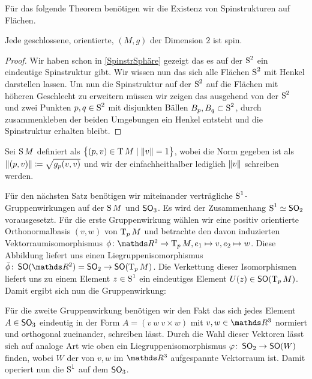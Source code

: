 Für das folgende Theorem benötigen wir die Existenz von Spinstrukturen
auf Flächen.
\begin{Satz}
	Jede geschlossene, orientierte, \RMF  $(M,g)$ der Dimension $2$ ist spin.
	\begin{proof}
		Wir haben schon in \cref{SpinstrSphäre} gezeigt das es 
		auf der $ \S^2 $ ein eindeutige Spinstruktur gibt. Wir
		wissen nun das sich alle Flächen $ \S^2 $ mit Henkel 
		darstellen lassen. Um nun die Spinstruktur auf der $ \S^2 $
		auf die Flächen mit höheren Geschlecht zu erweitern müssen
		wir zeigen das ausgehend von der $ \S^2 $ und zwei Punkten
		$ p,q \in\S^2 $ mit disjunkten Bällen $ B_p,B_q \subset\S^2$,
		durch zusammenkleben der beiden Umgebungen ein Henkel
		entsteht und die Spinstruktur erhalten bleibt.
	\end{proof}
\end{Satz}

Sei $\S M$ definiert als $\set{(p,v) \in \T M}{ \norm{v} = 1}$, wobei
die Norm gegeben ist als $ \norm{(p,v)} \coloneqq \sqrt{g_p(v,v)} $
und wir der einfachheithalber lediglich $ \norm{v} $ schreiben werden.

Für den nächsten Satz benötigen wir miteinander verträgliche $ \S^1 $-Gruppenwirkungen auf der $ \S M $ und $ \so_3 $. Es wird der
Zusammenhang $ \S^1 \simeq \so_2 $ vorausgesetzt. Für die erste
Gruppenwirkung wählen wir eine positiv orientierte Orthonormalbasis
$ (v,w) $ von $ \tang{p}{M} $ und betrachte den davon induzierten
Vektorraumisomorphismus $ \abb{\phi}{\R^2}{\tang{p}{M}},e_1 \mapsto v, e_2\mapsto w $. Diese
Abbildung liefert uns einen Liegruppenisomorphismus $\abb{\bar{\phi}}{\so(\R^2) = \so_2}{\so(\tang{p}{M})} $. Die Verkettung
dieser Isomorphismen liefert uns zu einem Element $ z\in\S^1 $ ein
eindeutiges Element $ U(z)\in \so(\tang{p}{M}) $. Damit ergibt sich
nun die Gruppenwirkung:

Für die zweite Gruppenwirkung benötigen wir den Fakt das sich jedes
Element $ A \in \so_3$  eindeutig in der Form $ A=\left( v~w~v\times w\right) $ mit $ v,w \in \R^3$ normiert und orthogonal zueinander, 
schreiben lässt. Durch die Wahl dieser Vektoren lässt sich auf
analoge Art wie oben ein Liegruppenisomorphismus $ \abb{\varphi}{\so_2}{\so(W)} $ finden, wobei $ W $ der von $ v,w $ 
im $ \R^3 $ aufgespannte Vektorraum ist. Damit operiert nun die
$ \S^1 $ auf dem $ \so_3 $.

